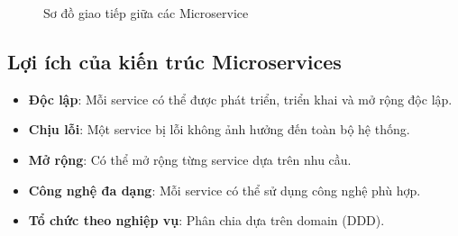 \documentclass[12pt,a4paper]{report}
\begin{document}
\begin{figure}[H]
\centering
{}
\caption{Sơ đồ giao tiếp giữa các Microservice}
\label{fig:microservices_communication}
\end{figure}

\subsection{Lợi ích của kiến trúc Microservices}

\begin{itemize}
\item \textbf{Độc lập}: Mỗi service có thể được phát triển, triển khai và mở rộng độc lập.
\item \textbf{Chịu lỗi}: Một service bị lỗi không ảnh hưởng đến toàn bộ hệ thống.
\item \textbf{Mở rộng}: Có thể mở rộng từng service dựa trên nhu cầu.
\item \textbf{Công nghệ đa dạng}: Mỗi service có thể sử dụng công nghệ phù hợp.
\item \textbf{Tổ chức theo nghiệp vụ}: Phân chia dựa trên domain (DDD).
\end{itemize}
\end{document}
